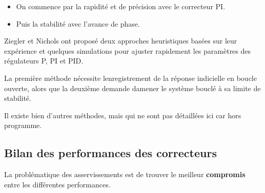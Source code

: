\begin{itemize}
\item
  On commence par la rapidité et de précision avec le correcteur PI.
\item
  Puis la stabilité avec l'avance de phase.
\end{itemize}

Ziegler et Nichols ont proposé deux approches heuristiques basées sur leur expérience et quelques simulations pour ajuster rapidement les paramètres des régulateurs P, PI et PID.

La première méthode nécessite l\textquotesingle enregistrement de la réponse indicielle en boucle ouverte, alors que la deuxième demande d\textquotesingle amener le système bouclé à sa limite de stabilité.

Il existe bien d'autres méthodes, mais qui ne sont pas détaillées ici car hors programme.

\hypertarget{bilan-des-performances-des-correcteurs}{%
\subsection{Bilan des performances des correcteurs}\label{bilan-des-performances-des-correcteurs}}

La problématique des asservissements est de trouver le meilleur \textbf{compromis} entre les différentes performances.

